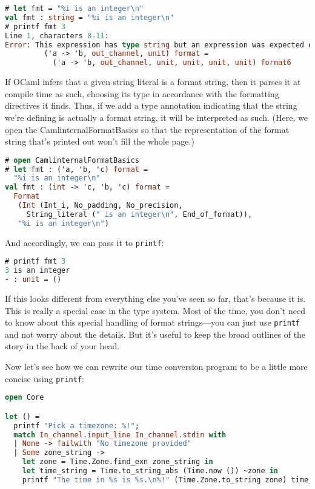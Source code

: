 \begin{lstlisting}[language=Caml]
# let fmt = "%i is an integer\n"
val fmt : string = "%i is an integer\n"
# printf fmt 3
Line 1, characters 8-11:
Error: This expression has type string but an expression was expected of type
         ('a -> 'b, out_channel, unit) format =
           ('a -> 'b, out_channel, unit, unit, unit, unit) format6
\end{lstlisting}

If OCaml infers that a given string literal is a format string, then it
parses it at compile time as such, choosing its type in accordance with
the formatting directives it finds. Thus, if we add a type annotation
indicating that the string we're defining is actually a format string,
it will be interpreted as such. (Here, we open the
CamlinternalFormatBasics so that the representation of the format string
that's printed out won't fill the whole page.)

\begin{lstlisting}[language=Caml]
# open CamlinternalFormatBasics
# let fmt : ('a, 'b, 'c) format =
  "%i is an integer\n"
val fmt : (int -> 'c, 'b, 'c) format =
  Format
   (Int (Int_i, No_padding, No_precision,
     String_literal (" is an integer\n", End_of_format)),
   "%i is an integer\n")
\end{lstlisting}

And accordingly, we can pass it to \passthrough{\lstinline!printf!}:

\begin{lstlisting}[language=Caml]
# printf fmt 3
3 is an integer
- : unit = ()
\end{lstlisting}

If this looks different from everything else you've seen so far, that's
because it is. This is really a special case in the type system. Most of
the time, you don't need to know about this special handling of format
strings---you can just use \passthrough{\lstinline!printf!} and not
worry about the details. But it's useful to keep the broad outlines of
the story in the back of your head.

Now let's see how we can rewrite our time conversion program to be a
little more concise using \passthrough{\lstinline!printf!}:

\begin{lstlisting}[language=Caml]
open Core

let () =
  printf "Pick a timezone: %!";
  match In_channel.input_line In_channel.stdin with
  | None -> failwith "No timezone provided"
  | Some zone_string ->
    let zone = Time.Zone.find_exn zone_string in
    let time_string = Time.to_string_abs (Time.now ()) ~zone in
    printf "The time in %s is %s.\n%!" (Time.Zone.to_string zone) time_string
\end{lstlisting}

